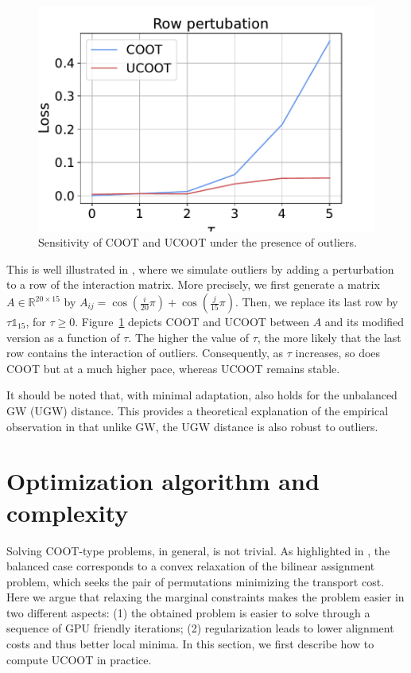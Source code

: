 \setlength{\columnsep}{10pt}%
\setlength{\intextsep}{0pt}
\begin{figure}
  \centering
  \vspace{-10pt}
  \includegraphics[width=\linewidth]{./Chapitre3/fig/robustness_2.pdf}
  \caption{Sensitivity of COOT and UCOOT under the presence of outliers.
  \label{fig:robust}}
\end{figure}
This is well illustrated in ,
where we simulate outliers by adding a perturbation to a row of the interaction matrix.
More precisely, we first generate a matrix $A \in \mathbb R^{20 \times 15}$ by
$A_{ij} = \cos(\frac{i}{20} \pi) + \cos(\frac{j}{15} \pi)$.
Then, we replace its last row by $\tau \mathds 1_{15}$, for $\tau \geq 0$.
Figure~\ref{fig:robust} depicts COOT and UCOOT between $A$
and its modified version as a function of $\tau$. The higher the value of $\tau$,
the more likely that the last row contains the interaction of outliers.
Consequently, as $\tau$ increases, so does COOT but at a much higher pace,
whereas UCOOT remains stable.

It should be noted that, with minimal adaptation, 
also holds for the unbalanced GW (UGW) distance.
This provides a theoretical explanation of the empirical observation in \citep{Sejourne20}
that unlike GW, the UGW distance is also robust to outliers.

\section{Optimization algorithm and complexity}
Solving COOT-type problems, in general, is not trivial. As highlighted in \citep{Redko20},
the balanced case corresponds to a convex relaxation of the bilinear assignment problem,
which seeks the pair of permutations minimizing the transport cost.
Here we argue that relaxing the marginal constraints makes the problem easier
in two different aspects: (1) the obtained problem is easier to solve
through a sequence of GPU friendly iterations; (2) regularization leads to lower alignment costs
and thus better local minima. In this section, we first describe how to compute UCOOT in practice.

